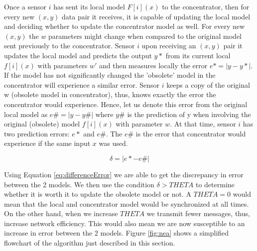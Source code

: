 \documentclass{mproj}
\begin{document}
Once a sensor $i$ has sent its local model $F[i](x)$ to the concentrator, then for every new $(x,y)$ data pair it receives, it is capable of updating the local model and deciding whether to update the concentrator model as well. For every new $(x,y)$ the $w$ parameters might change when compared to the original model sent previously to the concentrator. Sensor $i$ upon receiving an $(x,y)$ pair it updates the local model and predicts the output $y*$ from its current local $f[i](x)$ with parameters $w'$ and then measures locally the error $e* = |y-y*|$. If the model has not significantly changed the 'obsolete' model in the concentrator will experience a similar error. Sensor $i$ keeps a copy of the original w (obsolete model in concentrator), thus, knows exactly the error the concentrator would experience. Hence, let us denote this error from the original local model as $e\# = |y - y\#|$ where $y\#$ is the prediction of y when involving the original (obsolete) model $f[i](x)$ with parameter $w$. At that time, sensor $i$ has two prediction errors: $e*$ and $e\#$. The $e\#$ is the error that concentrator would experience if the same input $x$ was used.

\begin{equation}
\label{eq:differenceError}
\delta = |e* - e\#|
\end{equation}

Using Equation \ref{eq:differenceError} we are able to get the discrepancy in error between the 2 models. We then use the condition $\delta > THETA$ to determine whether it is worth it to update the obsolete model or not. A $THETA=0$ would mean that the local and concentrator model would be synchronized at all times. On the other hand, when we increase $THETA$ we transmit fewer messages, thus, increase network efficiency. This would also mean we are now susceptible to an increase in error between the 2 models. Figure \ref{fig:nea} shows a simplified flowchart of the algorithm just described in this section.
\end{document}
